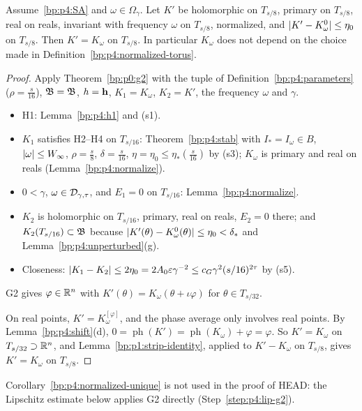 \begin{corollary}\label{bp:p4:normalized-unique}
Assume~\eqref{bp:p4:SA} and $\omega\in\Omega_\gamma$. Let $K'$ be holomorphic on $T_{s/8}$,
primary on $T_{s/8}$, real on reals, invariant with frequency $\omega$ on $T_{s/8}$, normalized,
and $\lvert K'-K^0_\omega\rvert\le\eta_0$ on $T_{s/8}$. Then $K'=K_\omega$ on $T_{s/8}$. In particular
$K_\omega$ does not depend on the choice made in Definition~\ref{bp:p4:normalized-torus}.
\end{corollary}

\begin{proof}
\label{step:p4:nu-g2}
Apply Theorem~\ref{bp:p0:g2} with the tuple of Definition~\ref{bp:p4:parameters} ($\rho=\frac s{16}$),
$\mathfrak B=\mathfrak{B}$, $h=\mathbf{h}$, $K_1=K_\omega$, $K_2=K'$, the frequency $\omega$ and $\gamma$.
\begin{itemize}
\item H1: Lemma~\ref{bp:p4:h1} and (s1).
\item $K_1$ satisfies H2--H4 on $T_{s/16}$: Theorem~\ref{bp:p4:stab} with $I_*=I_\omega\in B$,
  $\lvert \omega\rvert\le W_\infty$, $\rho=\frac s8$, $\delta=\frac s{16}$, $\eta=\eta_0\le\eta_*(\frac s{16})$ by
  (s3); $K_\omega$ is primary and real on reals (Lemma~\ref{bp:p4:normalize}).
\item $0<\gamma$, $\omega\in\mathcal{D}_{\gamma,\tau}$, and $E_1=0$ on $T_{s/16}$: Lemma~\ref{bp:p4:normalize}.
\item $K_2$ is holomorphic on $T_{s/16}$, primary, real on reals, $E_2=0$ there; and
  $K_2(T_{s/16})\subset\mathfrak{B}$ because $\lvert K'(\theta)-K^0_\omega(\theta)\rvert\le\eta_0<\delta_*$ and
  Lemma~\ref{bp:p4:unperturbed}(g).
\item Closeness: $\lvert K_1-K_2\rvert\le2\eta_0=2A_0\varepsilon\gamma^{-2}\le c_G\gamma^2(s/16)^{2\tau}$
  by (s5).
\end{itemize}
G2 gives $\varphi\in\mathbb{R}^n$ with $K'(\theta)=K_\omega(\theta+\iota\varphi)$ for $\theta\in T_{s/32}$.

\label{step:p4:nu-phase}
On real points, $K'=K_\omega^{[\varphi]}$, and the phase average only involves real points. By
Lemma~\ref{bp:p4:shift}(d), $0=\operatorname{ph}(K')=\operatorname{ph}(K_\omega)+\varphi=\varphi$. So
$K'=K_\omega$ on $T_{s/32}\supset\mathbb{R}^n$, and Lemma~\ref{bp:p1:strip-identity}, applied to $K'-K_\omega$ on
$T_{s/8}$, gives $K'=K_\omega$ on $T_{s/8}$.
\end{proof}

Corollary~\ref{bp:p4:normalized-unique} is not used in the proof of HEAD: the Lipschitz estimate below
applies G2 directly (Step~\ref{step:p4:lip-g2}).

